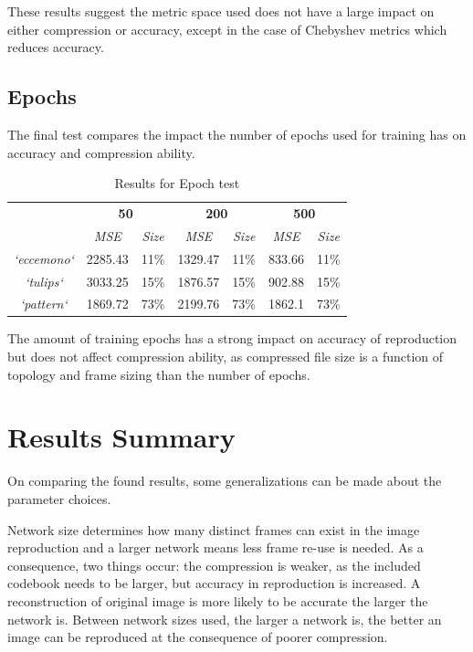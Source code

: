 \documentclass[a4paper,12pt]{article}
\begin{document}
These results suggest the metric space used does not have a large impact on either compression or accuracy, except in the case of Chebyshev metrics which reduces accuracy.

\pagebreak

\subsection{Epochs}

The final test compares the impact the number of epochs used for training has on accuracy and compression ability.

\begin{table}[h!]
\footnotesize
\centering
\begin{tabular}{c|c|c|c|c|c|c|}
\cline{2-7}
 & \multicolumn{2}{c|}{\textbf{50}} & \multicolumn{2}{c|}{\textbf{200}} & \multicolumn{2}{c|}{\textbf{500}} \\ \cline{2-7} 
 & \textit{MSE} & \textit{Size} & \textit{MSE} & \textit{Size} & \textit{MSE} & \textit{Size} \\ \hline
\multicolumn{1}{|c|}{\textit{`eccemono`}} & 2285.43 & 11\% & 1329.47 & 11\% & 833.66 & 11\% \\ \hline
\multicolumn{1}{|c|}{\textit{`tulips`}} & 3033.25 & 15\% & 1876.57 & 15\% & 902.88 & 15\% \\ \hline
\multicolumn{1}{|c|}{\textit{`pattern`}} & 1869.72 & 73\% & 2199.76 & 73\% & 1862.1 & 73\% \\ \hline
\end{tabular}
\caption{Results for Epoch test}
\end{table}

The amount of training epochs has a strong impact on accuracy of reproduction but does not affect compression ability, as compressed file size is a function of topology and frame sizing than the number of epochs.

\section{Results Summary}

On comparing the found results, some generalizations can be made about the parameter choices.

Network size determines how many distinct frames can exist in the image reproduction and a larger network means less frame re-use is needed. As a consequence, two things occur: the compression is weaker, as the included codebook needs to be larger, but accuracy in reproduction is increased. A reconstruction of original image is more likely to be accurate the larger the network is. Between network sizes used, the larger a network is, the better an image can be reproduced at the consequence of poorer compression.
\end{document}
